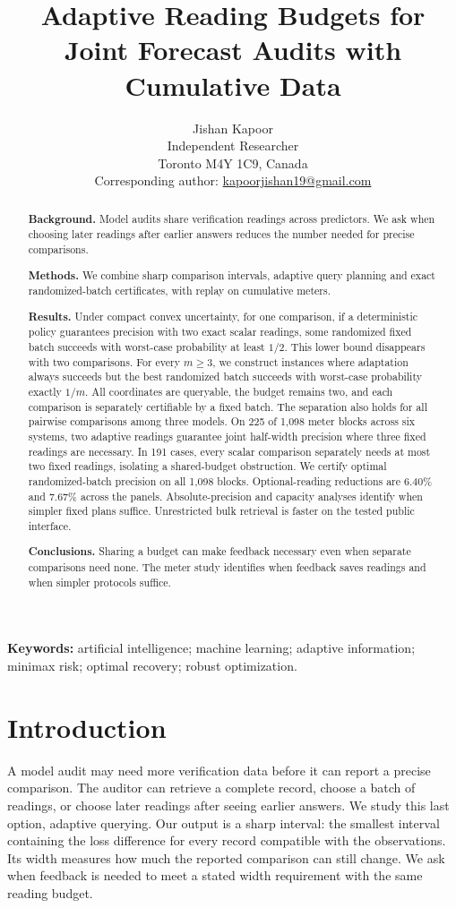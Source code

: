 \documentclass[12pt]{article}
\title{Adaptive Reading Budgets for Joint Forecast Audits with Cumulative Data}
\author{Jishan Kapoor\\Independent Researcher\\Toronto M4Y 1C9, Canada\\
Corresponding author: \href{mailto:kapoorjishan19@gmail.com}{kapoorjishan19@gmail.com}}
\date{}
\begin{document}
\maketitle
\begin{abstract}
\textbf{Background.} Model audits share verification readings across
predictors. We ask when choosing later readings after earlier answers
reduces the number needed for precise comparisons.

\textbf{Methods.} We combine sharp comparison intervals, adaptive query
planning and exact randomized-batch certificates, with replay on cumulative meters.

\textbf{Results.} Under compact convex uncertainty, for one comparison,
if a deterministic policy guarantees
precision with two exact scalar readings, some randomized fixed batch succeeds with
worst-case probability at least $1/2$. This lower bound disappears with two
comparisons. For every $m\geq3$, we construct instances where adaptation
always succeeds but the best randomized batch succeeds with worst-case
probability exactly $1/m$. All coordinates are queryable, the budget remains
two, and each comparison is separately certifiable by a fixed batch.
The separation also holds for all pairwise comparisons among three models.
On 225 of 1,098 meter blocks across six systems, two adaptive readings
guarantee joint half-width precision where three fixed readings are necessary.
In 191 cases, every scalar comparison separately needs at most two fixed
readings, isolating a shared-budget obstruction. We certify optimal randomized-batch
precision on all 1,098 blocks. Optional-reading reductions are 6.40\%
and 7.67\% across the panels. Absolute-precision and capacity analyses
identify when simpler fixed plans suffice. Unrestricted bulk retrieval
is faster on the tested public interface.

\textbf{Conclusions.} Sharing a budget can make feedback necessary even when
separate comparisons need none. The meter study identifies when feedback
saves readings and when simpler protocols suffice.
\end{abstract}
\noindent\textbf{Keywords:} artificial intelligence; machine learning;
adaptive information; minimax risk; optimal recovery; robust optimization.

\section{Introduction}
A model audit may need more verification data before it can report a precise
comparison. The auditor can retrieve a complete record, choose a batch of
readings, or choose later readings after seeing earlier answers. We study
this last option, adaptive querying. Our output is a sharp interval: the
smallest interval containing the loss difference for every record compatible
with the observations. Its width measures how much the reported comparison
can still change. We ask when feedback is needed to meet a stated width
requirement with the same reading budget.
\end{document}
